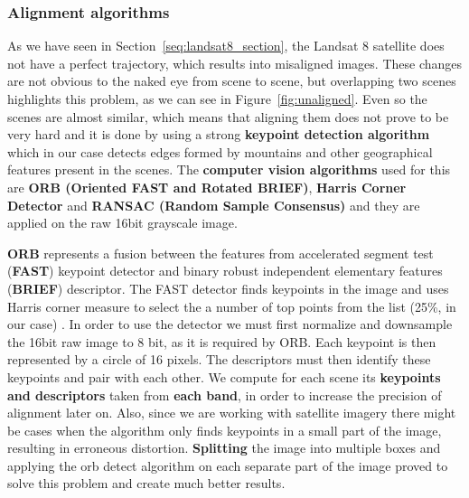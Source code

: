 \documentclass[11pt, a4paper]{report}
\begin{document}
	\subsubsection{Alignment algorithms}
	\label{seq:alignment_algorithm}
	
	As we have seen in Section~\ref{seq:landsat8_section}, the Landsat 8 satellite does not have a perfect trajectory, which results into misaligned images. These changes are not obvious to the naked eye from scene to scene, but overlapping two scenes highlights this problem, as we can see in Figure~\ref{fig:unaligned}. Even so the scenes are almost similar, which means that aligning them does not prove to be very hard and it is done by using a strong \textbf{keypoint detection algorithm} which in our case detects edges formed by mountains and other geographical features present in the scenes. The \textbf{computer vision algorithms} used for this are \textbf{ORB (Oriented FAST and Rotated BRIEF)}, \textbf{Harris Corner Detector} and \textbf{RANSAC (Random Sample Consensus)} and they are applied on the raw 16bit grayscale image.
	
	\textbf{ORB} represents a fusion between the features from accelerated segment test (\textbf{FAST}) keypoint detector and binary robust independent elementary features (\textbf{BRIEF}) descriptor. The FAST detector finds keypoints in the image and uses Harris corner measure to select the a number of top points from the list (25\%, in our case) \cite{orb}. In order to use the detector we must first normalize and downsample the 16bit raw image to 8 bit, as it is required by ORB. Each keypoint is then represented by a circle of 16 pixels. The descriptors must then identify these keypoints and pair with each other.
	We compute for each scene its \textbf{keypoints and descriptors} taken from \textbf{each band}, in order to increase the precision of alignment later on. Also, since we are working with satellite imagery there might be cases when the algorithm only finds keypoints in a small part of the image, resulting in erroneous distortion. \textbf{Splitting} the image into multiple boxes and applying the orb detect algorithm on each separate part of the image proved to solve this problem and create much better results. 
	
\end{document}
